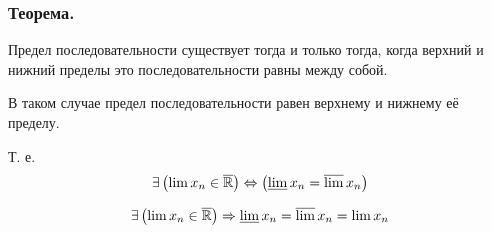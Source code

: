 \subsubsection{Теорема.}

Предел последовательности существует тогда и только тогда, когда верхний и нижний пределы это последовательности равны между собой.

В таком случае предел последовательности равен верхнему и нижнему её пределу.

Т. е.
$$
\exists\left( \lim{x_n}\in\overline{\mathbb{R}} \right) \Leftrightarrow \left(\varliminf x_n = \varlimsup x_n\right) 
$$

$$
\exists\left( \lim{x_n}\in\overline{\mathbb{R}} \right) \Rightarrow  \varliminf x_n = \varlimsup x_n = \lim x_n 
$$
